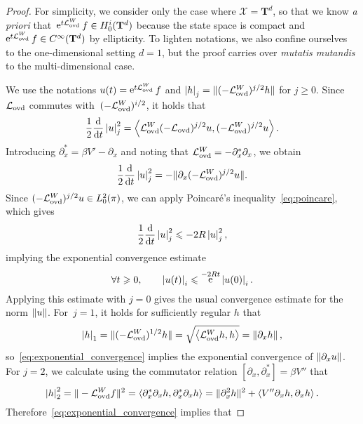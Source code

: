 \documentclass[11pt,a4paper]{article}
\DeclareMathOperator{\e}{e}
\newcommand{\commut}[2]{[#1, #2]}
\newcommand{\torus}{\mathbf T}
\theoremstyle{plain}
\numberwithin{equation}{section}
\renewcommand{\leq}{\leqslant}
\renewcommand{\geq}{\geqslant}
\begin{document}
\begin{proof}
    For simplicity, we consider only the case where $\mathcal X = \torus^d$,
    so that we know \emph{a priori} that~$\e^{t \mathcal L_{\rm ovd}^W} f \in H^i_0(\torus^d)$ because
    the state space is compact and $\e^{t \mathcal L_{\rm ovd}^W} f \in C^{\infty}(\torus^d)$ by ellipticity.
    To lighten notations,
    we also confine ourselves to the one-dimensional setting $d = 1$,
    but the proof carries over \emph{mutatis mutandis} to the multi-dimensional case.

    We use the notations $u(t) = \e^{t \mathcal L_{\rm ovd}^W} f$ and
     $\seminorm{h}_j = \norm*{(- \mathcal L_{\rm ovd}^W)^{j/2} h}$ for $j \geq 0$.
    Since $\mathcal L_{\rm ovd}$ commutes with~$(-\mathcal L_{\rm ovd}^W)^{i/2}$,
    it holds that
    \[
        \frac{1}{2} \derivative*{1}{t} \seminorm{u}_j^2 = \ip{\mathcal L_{\rm ovd}^W (-\mathcal L_{\rm ovd})^{j/2} u}{(- \mathcal L_{\rm ovd}^W)^{j/2} u}.
    \]
    Introducing $\partial_x^* = \beta V' - \partial_x$
    and noting that $\mathcal L_{\rm ovd}^W = - \partial_x^* \partial_x$,
    we obtain
    \[
        \frac{1}{2} \derivative*{1}{t} \seminorm{u}_j^2 = - \norm*{\partial_x (-\mathcal L_{\rm ovd}^W)^{j/2} u}.
    \]
    Since $(-\mathcal L_{\rm ovd}^W)^{j/2} u \in L^2_0(\pi)$,
    we can apply Poincar\'e's inequality~\eqref{eq:poincare}, 
    which gives
    \[
        \frac{1}{2} \derivative*{1}{t} \seminorm{u}_j^2 \leq - 2R \seminorm{u}_j^2,
    \]
    implying the exponential convergence estimate
    \begin{equation}
        \label{eq:exponential_convergence}
        \forall t \geq 0, \qquad
        \seminorm{u(t)}_i \leq \e^{- 2 R t} \seminorm{u(0)}_i.
    \end{equation}
    Applying this estimate with $j = 0$ gives the usual convergence estimate for the norm $\norm{u}$.
    For~$j = 1$, it holds for sufficiently regular $h$ that
    \[
        \seminorm{h}_1 = \norm*{(- \mathcal L_{\rm ovd}^W)^{1/2} h} = \sqrt{\ip{\mathcal L_{\rm ovd}^W h}{h}} = \norm{\partial_x h},
    \]
    so~\eqref{eq:exponential_convergence} implies the exponential convergence of $\norm{\partial_x u}$.
    For $j = 2$, we calculate using the commutator relation $\commut{\partial_x}{\partial_x^*} = \beta V''$ that
    \[
        \seminorm{h}_2^2 = \norm*{- \mathcal L_{\rm ovd}^Wf}^2
        = \ip{\partial_x^* \partial_x h}{\partial_x^* \partial_x h}
        = \norm*{\partial_x^2 h}^2 + \ip{V'' \partial_x h}{\partial_x h}.
    \]
    Therefore~\eqref{eq:exponential_convergence} implies that

\end{proof}
\end{document}
